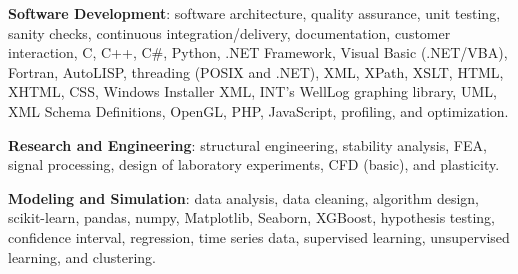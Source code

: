\documentclass{leresume}
\begin{document}
    \begin{bulletedlist}
		
		\item \textbf{Software Development}: software architecture,
                        quality assurance,
                        unit testing,
                        sanity checks,
                        continuous integration/delivery,
                        documentation,
                        customer interaction,
                        C,
                        C++,
                        C\#,
                        Python,
                        .NET Framework,
                        Visual Basic (.NET/VBA),
                        Fortran,
                        AutoLISP,
                        threading (POSIX and .NET),
                        XML,
                        XPath,
                        XSLT,
                        HTML,
                        XHTML,
                        CSS,
                        Windows Installer XML,
                        INT's WellLog graphing library,
                        UML,
                        XML Schema Definitions,
                        OpenGL,
                        PHP,
                        JavaScript,
                        profiling,
                        and optimization.
                        
		\item \textbf{Research and Engineering}: structural engineering,
                        stability analysis,
                        FEA,
                        signal processing,
                        design of laboratory experiments,
                        CFD (basic),
                        and plasticity.
                        
		\item \textbf{Modeling and Simulation}: data analysis,
                        data cleaning,
                        algorithm design,
                        scikit-learn,
                        pandas,
                        numpy,
                        Matplotlib,
                        Seaborn,
                        XGBoost,
                        hypothesis testing,
                        confidence interval,
                        regression,
                        time series data,
                        supervised learning,
                        unsupervised learning,
                        and clustering.
                        

\end{bulletedlist}
\end{document}

